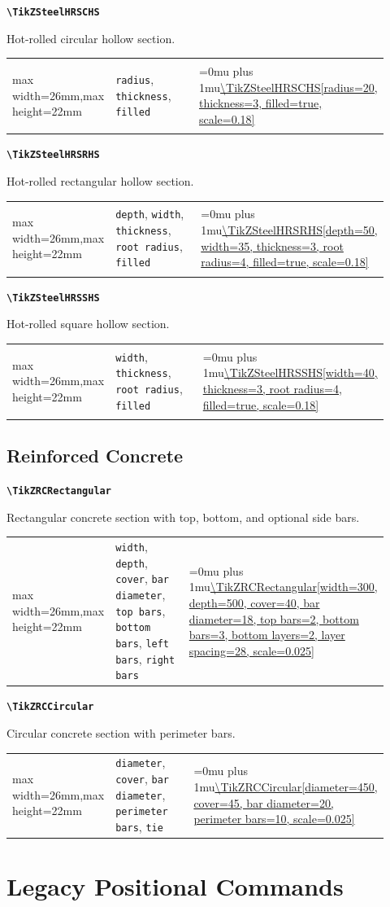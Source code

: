 \documentclass[10pt]{article}
\makeatletter
\newcommand{\command}[1]{\texttt{\textbackslash #1}}
\newcommand{\keyname}[1]{\texttt{#1}}
\newcommand{\CodeInline}[1]{%
  \begingroup
  \ttfamily\scriptsize\raggedright\Urlmuskip=0mu plus 1mu\url{#1}%
  \endgroup
}
\newcommand{\ShapePreview}[1]{%
  \begin{center}
  \begin{adjustbox}{max width=26mm,max height=22mm}
    \begin{tikzpicture}
      #1
    \end{tikzpicture}
  \end{adjustbox}
  \end{center}
}
\newcommand{\ReferenceRow}[6]{%
  \textbf{\command{#1}}\par
  #2\par
  \vspace{2pt}
  \begin{tabular}{@{}p{0.20\linewidth}p{0.34\linewidth}p{0.38\linewidth}@{}}
    #6 & \footnotesize #3 & \CodeInline{#4}
  \end{tabular}
  \par\vspace{4mm}
}
\makeatother
\begin{document}
\ReferenceRow
  {TikZSteelHRSCHS}
  {Hot-rolled circular hollow section.}
  {\keyname{radius}, \keyname{thickness}, \keyname{filled}}
  {\TikZSteelHRSCHS[radius=20, thickness=3, filled=true, scale=0.18]}
  {}
  {\ShapePreview{\TikZSteelHRSCHS[radius=20, thickness=3, filled=true, scale=0.18]}}

\ReferenceRow
  {TikZSteelHRSRHS}
  {Hot-rolled rectangular hollow section.}
  {\keyname{depth}, \keyname{width}, \keyname{thickness}, \keyname{root radius}, \keyname{filled}}
  {\TikZSteelHRSRHS[depth=50, width=35, thickness=3, root radius=4, filled=true, scale=0.18]}
  {}
  {\ShapePreview{\TikZSteelHRSRHS[depth=50, width=35, thickness=3, root radius=4, filled=true, scale=0.18]}}

\ReferenceRow
  {TikZSteelHRSSHS}
  {Hot-rolled square hollow section.}
  {\keyname{width}, \keyname{thickness}, \keyname{root radius}, \keyname{filled}}
  {\TikZSteelHRSSHS[width=40, thickness=3, root radius=4, filled=true, scale=0.18]}
  {}
  {\ShapePreview{\TikZSteelHRSSHS[width=40, thickness=3, root radius=4, filled=true, scale=0.18]}}

\subsection{Reinforced Concrete}

\ReferenceRow
  {TikZRCRectangular}
  {Rectangular concrete section with top, bottom, and optional side bars.}
  {\keyname{width}, \keyname{depth}, \keyname{cover}, \keyname{bar diameter}, \keyname{top bars}, \keyname{bottom bars}, \keyname{left bars}, \keyname{right bars}}
  {\TikZRCRectangular[width=300, depth=500, cover=40, bar diameter=18, top bars=2, bottom bars=3, bottom layers=2, layer spacing=28, scale=0.025]}
  {}
  {\ShapePreview{\TikZRCRectangular[width=300, depth=500, cover=40, bar diameter=18, top bars=2, bottom bars=3, bottom layers=2, layer spacing=28, scale=0.025]}}

\ReferenceRow
  {TikZRCCircular}
  {Circular concrete section with perimeter bars.}
  {\keyname{diameter}, \keyname{cover}, \keyname{bar diameter}, \keyname{perimeter bars}, \keyname{tie}}
  {\TikZRCCircular[diameter=450, cover=45, bar diameter=20, perimeter bars=10, scale=0.025]}
  {}
  {\ShapePreview{\TikZRCCircular[diameter=450, cover=45, bar diameter=20, perimeter bars=10, scale=0.025]}}

\section{Legacy Positional Commands}
\end{document}
